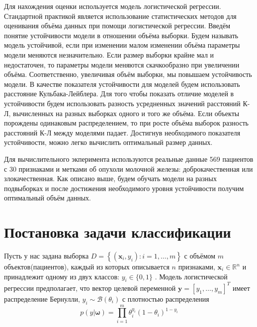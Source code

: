 \documentclass[12pt,twoside]{article}
\begin{document}
Для нахождения оценки используется модель логистической регрессии\cite{hosmer2013applied}. Стандартной практикой является использование статистических методов\cite{demidenko2007sample} для оценивания объёма данных при помощи логистической регрессии. Введём понятие устойчивости модели в отношении объёма выборки. Будем называть модель устойчивой, если при изменении малом изменении объёма параметры модели меняются незначительно.
Если размер выборки крайне мал и недостаточен, то параметры модели меняются скачкообразно при увеличении объёма. Соответственно, увеличивая объём выборки, мы повышаем устойчивость модели. В качестве показателя устойчивости
для моделей будем использовать расстояние Кульбака-Лейблера. Для того чтобы показать отличие моделей в устойчивости будем использовать разность усредненных значений расстояний К-Л, вычисленных на разных выборках одного и того же объёма. Если объекты порождены одинаковым распределением, то при росте объёма выборок разность расстояний К-Л между моделями падает. Достигнув необходимого показателя устойчивости, можно легко вычислить оптимальный размер данных.

Для вычислительного экперимента используются реальные данные 569 пациентов с 30 признаками и метками об опухоли молочной железы: доброкачественная или злокачественная. Как описано выше, будем обучать модели на разных подвыборках и после достижения необходимого уровня устойчивости получим оптимальный объём данных.


\section{Постановка задачи классификации}

Пусть у нас задана выборка $D = \left\{ \left( \mathbf { x } _ { i } , y _ { i } \right) : i = 1 , \ldots , m \right\}$ с объёмом $m$ объектов(пациентов), каждый из которых описывается $n$ признаками, $\mathbf { x } _ { i } \in \mathbb { R } ^ { n }$ и принадлежит одному из двух классов: $y _ { i } \in \{ 0,1 \}$ . Модель логистической регрессии предполагает, что вектор целевой переменной $\mathbf { y } = \left[ y _ { 1 } , \dots , y _ { m } \right] ^ { T }$ имеет распределение Бернулли, $y _ { i } \sim \mathscr { B } \left( \theta _ { i } \right)$ с плотностью распределения
\begin{equation}\label{eq:frst}
p (  { y } | \boldsymbol { \omega } ) = \prod _ { i = 1 } ^ { m } \theta _ { i } ^ { y _ { i } } \left( 1 - \theta _ { i } \right) ^ { 1 - y _ { i } } 
\end{equation}
\end{document}

